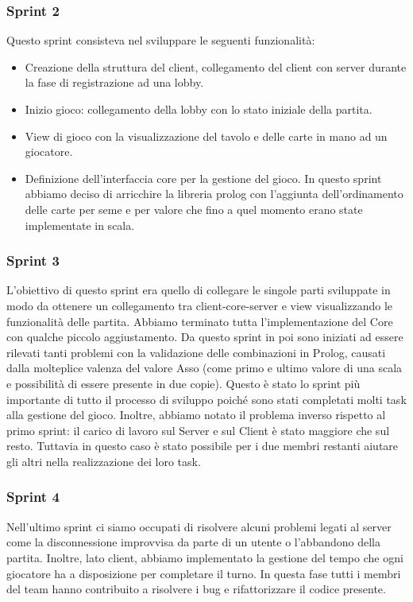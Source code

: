 \subsubsection{Sprint 2}
Questo sprint consisteva nel sviluppare le seguenti funzionalità:
\begin{itemize}
    \item Creazione della struttura del client, collegamento del client con server durante la fase di registrazione ad una lobby.
    \item Inizio gioco: collegamento della lobby con lo stato iniziale della partita.
    \item View di gioco con la visualizzazione del tavolo e delle carte in mano ad un giocatore.
    \item Definizione dell’interfaccia core per la gestione del gioco.
    In questo sprint abbiamo deciso di arricchire la libreria prolog con l’aggiunta dell’ordinamento delle carte per seme e per valore che fino a quel momento erano state implementate in scala.
\end{itemize}

\subsubsection{Sprint 3}
L’obiettivo di questo sprint era quello di collegare le singole parti sviluppate in modo da ottenere un collegamento tra client-core-server e view visualizzando le funzionalità delle partita.
Abbiamo terminato tutta l’implementazione del Core con qualche piccolo aggiustamento.
Da questo sprint in poi sono iniziati ad essere rilevati tanti problemi con la validazione delle combinazioni in Prolog, causati dalla molteplice valenza del valore Asso (come primo e ultimo valore di una scala e possibilità di essere presente in due copie).
\newline
Questo è stato lo sprint più importante di tutto il processo di sviluppo poiché sono stati completati molti task alla gestione del gioco.
Inoltre, abbiamo notato il problema inverso rispetto al primo sprint: il carico di lavoro sul Server e sul Client è stato maggiore che sul resto.
Tuttavia in questo caso è stato possibile per i due membri restanti aiutare gli altri nella realizzazione dei loro task.

\subsubsection{Sprint 4}
Nell’ultimo sprint ci siamo occupati di risolvere alcuni problemi legati al server come la disconnessione improvvisa da parte di un utente o l’abbandono della partita.
Inoltre, lato client, abbiamo implementato la gestione del tempo che ogni giocatore ha a disposizione per completare il turno.
In questa fase tutti i membri del team hanno contribuito a risolvere i bug e rifattorizzare il codice presente.

